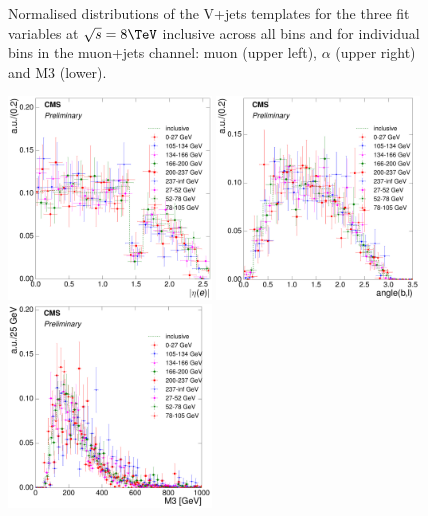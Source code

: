 \begin{figure}[hbtp]
	 \caption{Normalised distributions of the V+jets templates for the three fit variables at $\sqrt{s}=8\TeV$
	 inclusive across all \mt bins and for individual \mt bins in the muon+jets channel: muon \abseta (upper
	 left), $\alpha$ (upper right) and M3 (lower).}
     \label{fig:MT_fit_variable_vjets_comparisons_muon_8TeV}
\end{figure}

\begin{figure}[hbtp]
    \centering
     \includegraphics[width=0.48\textwidth]{Chapters/04_Analysis/04b_XSections/images/8TeV/fit_variables/electron/WPT/electron_absolute_eta/vjets/WPT_electron_absolute_eta_2orMoreBtags_VJets_template_comparison.pdf}\hfill
     \includegraphics[width=0.48\textwidth]{Chapters/04_Analysis/04b_XSections/images/8TeV/fit_variables/electron/WPT/angle_bl/vjets/WPT_angle_bl_2orMoreBtags_VJets_template_comparison.pdf}\hfill
     \includegraphics[width=0.48\textwidth]{Chapters/04_Analysis/04b_XSections/images/8TeV/fit_variables/electron/WPT/M3/vjets/WPT_M3_2orMoreBtags_VJets_template_comparison.pdf}\\

\end{figure}
